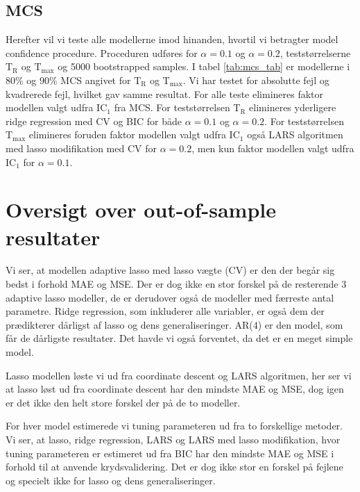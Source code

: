 \subsection{MCS} 
Herefter vil vi teste alle modellerne imod hinanden, hvortil vi betragter model confidence procedure.
Proceduren udføres for \(\alpha = 0.1\) og \(\alpha = 0.2\), teststørrelserne \(\text{T}_\text{R}\) og \(\text{T}_\text{max}\) og 5000 bootstrapped samples.
I tabel \ref{tab:mcs_tab} er modellerne i 80\% og 90\% MCS angivet for \(\text{T}_\text{R}\) og \(\text{T}_\text{max}\).
Vi har testet for absolutte fejl og kvadrerede fejl, hvilket gav samme resultat.
For alle teste elimineres faktor modellen valgt udfra IC\(_1\) fra MCS.
For teststørrelsen \(\text{T}_\text{R}\) elimineres yderligere ridge regression med CV og BIC for både \(\alpha = 0.1\) og \(\alpha = 0.2\).
For teststørrelsen \(\text{T}_\text{max}\) elimineres foruden faktor modellen valgt udfra IC\(_1\) også LARS algoritmen med lasso modifikation med CV for \(\alpha = 0.2\), men kun faktor modellen valgt udfra IC\(_1\) for \(\alpha = 0.1\).
%

%

\section{Oversigt over out-of-sample resultater}
Vi ser, at modellen adaptive lasso med lasso vægte (CV) er den der begår sig bedst i forhold MAE og MSE. Der er dog ikke en stor forskel på de resterende 3 adaptive lasso modeller, de er derudover også de modeller med færreste antal parametre. 
Ridge regression, som inkluderer alle variabler, er også dem der prædikterer dårligst af lasso og dens generaliseringer. 
AR(4) er den model, som får de dårligste resultater. 
Det havde vi også forventet, da det er en meget simple model. 

Lasso modellen løste vi ud fra coordinate descent og LARS algoritmen, her ser vi at lasso løst ud fra coordinate descent har den mindste MAE og MSE, dog igen er det ikke den helt store forskel der på de to modeller. 

For hver model estimerede vi tuning parameteren ud fra to forskellige metoder. Vi ser, at lasso, ridge regression, LARS og LARS med lasso modifikation, hvor tuning parameteren er estimeret ud fra BIC har den mindste MAE og MSE i forhold til at anvende krydsvalidering. Det er dog ikke stor en forskel på fejlene og specielt ikke for lasso og dens generaliseringer. 

%
%


